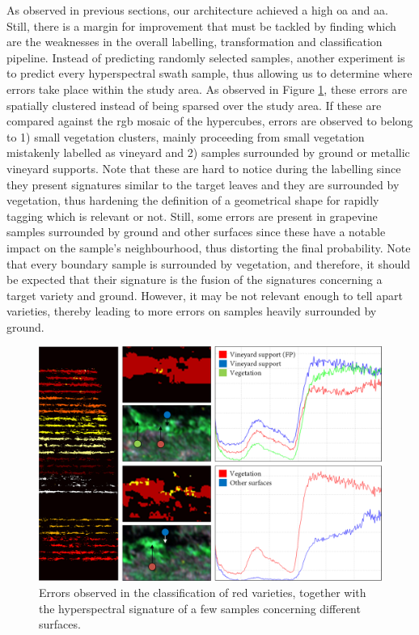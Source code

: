 As observed in previous sections, our architecture achieved a high \acrshort{oa} and \acrshort{aa}. Still, there is a margin for improvement that must be tackled by finding which are the weaknesses in the overall labelling, transformation and classification pipeline. Instead of predicting randomly selected samples, another experiment is to predict every hyperspectral swath sample, thus allowing us to determine where errors take place within the study area. As observed in Figure \ref{fig:spatial_labelling_errors}, these errors are spatially clustered instead of being sparsed over the study area. If these are compared against the \acrshort{rgb} mosaic of the hypercubes, errors are observed to belong to 1) small vegetation clusters, mainly proceeding from small vegetation mistakenly labelled as vineyard and 2) samples surrounded by ground or metallic vineyard supports. Note that these are hard to notice during the labelling since they present signatures similar to the target leaves and they are surrounded by vegetation, thus hardening the definition of a geometrical shape for rapidly tagging which is relevant or not. Still, some errors are present in grapevine samples surrounded by ground and other surfaces since these have a notable impact on the sample's neighbourhood, thus distorting the final probability. Note that every boundary sample is surrounded by vegetation, and therefore, it should be expected that their signature is the fusion of the signatures concerning a target variety and ground. However, it may be not relevant enough to tell apart varieties, thereby leading to more errors on samples heavily surrounded by ground.

\begin{figure}[ht]
    \centering
    \includegraphics[width=\linewidth]{figs/vineyard_classification/spatial_labelling.png}
	\caption{Errors observed in the classification of red varieties, together with the hyperspectral signature of a few samples concerning different surfaces.  }
	\label{fig:spatial_labelling_errors}
\end{figure}

